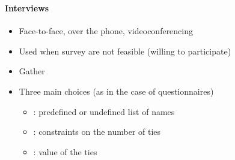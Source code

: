 \documentclass[8pt]{beamer}
\begin{document}

\begin{frame}
\frametitle{\insertsection}
\framesubtitle{Interviews}

\begin{itemize}
\item Face-to-face, over the phone, videoconferencing
\item Used when survey are not feasible (willing to participate)
\item Gather {\color{blue}{ego-network data}}
\item Three main choices (as in the case of questionnaires)
    \begin{itemize}
    \item {\color{blue}{Choice 1}}: predefined or undefined list of names 
    \item {\color{blue}{Choice 2}}: constraints on the number of ties
    \item {\color{blue}{Choice 3}}: value of the ties
    \end{itemize}
\end{itemize}

\end{frame}

\end{document}
